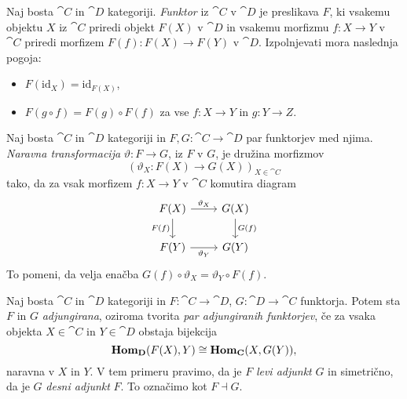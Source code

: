 \documentclass[../kategoricna_logika.tex]{subfiles}
\begin{document}
\begin{definicija}
  Naj bosta $\cat{C}$ in $\cat{D}$ kategoriji. \emph{Funktor} iz $\cat{C}$ v $\cat{D}$
  je preslikava $F$, ki vsakemu objektu $X$ iz \(\cat{C}\) priredi objekt \(F(X)\) v $\cat{D}$
  in vsakemu morfizmu $f: X \to Y$ v $\cat{C}$ priredi morfizem $F(f): F(X) \to F(Y)$ v $\cat{D}$.
  Izpolnjevati mora naslednja pogoja:
  \begin{itemize}
  \item $F(\mathrm{id}_X) = \mathrm{id}_{F(X)}$,
  \item $F(g \circ f) = F(g) \circ F(f)$ za vse $f : X \to Y$ in $g : Y \to Z$.
  \end{itemize}
\end{definicija}
\begin{definicija}
  Naj bosta $\cat{C}$ in $\cat{D}$ kategoriji in $F,G : \cat{C} \to \cat{D}$ par funktorjev
  med njima. \emph{Naravna transformacija} $\vartheta : F \to G$, iz $F$ v $G$, je
  družina morfizmov
  \[ (\vartheta_X : F(X) \to G(X))_{X \in \cat{C}}\]
  tako, da za vsak morfizem $f : X \to Y$ v $\cat{C}$ komutira diagram
  \begin{equation*}
    \begin{tikzcd}
      F(X) \ar[d, "F(f)"'] \ar[r, "\vartheta_X"] & G(X) \ar[d, "G(f)"] \\
      F(Y) \ar[r, "\vartheta_Y"'] & G(Y)
    \end{tikzcd}
  \end{equation*}
  To pomeni, da velja enačba \( G(f) \circ \vartheta_X = \vartheta_Y \circ F(f)\).
\end{definicija}
\begin{definicija}
  Naj bosta $\cat{C}$ in $\cat{D}$ kategoriji in $F : \cat{C} \to \cat{D}$, $G : \cat{D} \to \cat{C}$
  funktorja. Potem sta $F$ in $G$ \emph{adjungirana}, oziroma tvorita
  \emph{par adjungiranih funktorjev}, če za vsaka objekta $X \in \cat{C}$ in $Y \in \cat{D}$
  obstaja bijekcija
  \[ \mathbf{Hom}_{{\operatorname{\mathbf{D}}}}(F(X), Y) \cong \mathbf{Hom}_{{\operatorname{\mathbf{C}}}}(X, G(Y)),\]
  naravna v $X$ in $Y$.
  V tem primeru pravimo, da je $F$ \emph{levi adjunkt} $G$ in simetrično, da je $G$
  \emph{desni adjunkt} $F$. To označimo kot $F \dashv G$.
\end{definicija}
\end{document}
